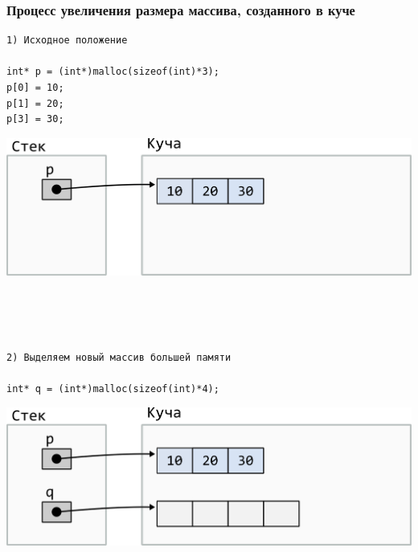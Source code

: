 \documentclass{article}
\begin{document}
\subsubsection*{Процесс увеличения размера массива, созданного в куче}


\noindent\begin{minipage}{.45\textwidth}
\begin{lstlisting}
1) Исходное положение

int* p = (int*)malloc(sizeof(int)*3);
p[0] = 10;
p[1] = 20;
p[3] = 30;
\end{lstlisting}
\end{minipage}
\begin{minipage}{.45\textwidth}
\includegraphics[scale=0.75]{../images/malloc_realocation1.png}
\end{minipage}
\quad\\
\quad\\
\quad\\


\noindent\begin{minipage}{.45\textwidth}
\begin{lstlisting}
2) Выделяем новый массив большей памяти

int* q = (int*)malloc(sizeof(int)*4);
\end{lstlisting}
\end{minipage}
\begin{minipage}{.45\textwidth}
\includegraphics[scale=0.75]{../images/malloc_realocation2.png}
\end{minipage}
\quad\\
\quad\\
\quad\\
\end{document}
